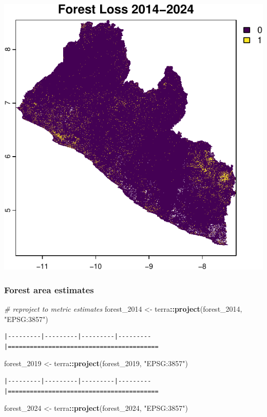 \documentclass[
]{article}
\newenvironment{Shaded}{\begin{snugshade}}{\end{snugshade}}
\newcommand{\CommentTok}[1]{\textcolor[rgb]{0.56,0.35,0.01}{\textit{#1}}}
\newcommand{\FunctionTok}[1]{\textcolor[rgb]{0.13,0.29,0.53}{\textbf{#1}}}
\newcommand{\NormalTok}[1]{#1}
\newcommand{\OtherTok}[1]{\textcolor[rgb]{0.56,0.35,0.01}{#1}}
\newcommand{\SpecialCharTok}[1]{\textcolor[rgb]{0.81,0.36,0.00}{\textbf{#1}}}
\newcommand{\StringTok}[1]{\textcolor[rgb]{0.31,0.60,0.02}{#1}}
\begin{document}
\includegraphics[width=0.33\linewidth]{rspb-gola-redd-review_files/figure-latex/unnamed-chunk-21-6}

\subsubsection{Forest area estimates}\label{forest-area-estimates}

\begin{Shaded}
\begin{Highlighting}[]
\CommentTok{\# reproject to metric estimates}
\NormalTok{forest\_2014 }\OtherTok{\textless{}{-}}\NormalTok{ terra}\SpecialCharTok{::}\FunctionTok{project}\NormalTok{(forest\_2014, }\StringTok{"EPSG:3857"}\NormalTok{)}
\end{Highlighting}
\end{Shaded}

\begin{verbatim}
|---------|---------|---------|---------|=========================================                                          
\end{verbatim}

\begin{Shaded}
\begin{Highlighting}[]
\NormalTok{forest\_2019 }\OtherTok{\textless{}{-}}\NormalTok{ terra}\SpecialCharTok{::}\FunctionTok{project}\NormalTok{(forest\_2019, }\StringTok{"EPSG:3857"}\NormalTok{)}
\end{Highlighting}
\end{Shaded}

\begin{verbatim}
|---------|---------|---------|---------|=========================================                                          
\end{verbatim}

\begin{Shaded}
\begin{Highlighting}[]
\NormalTok{forest\_2024 }\OtherTok{\textless{}{-}}\NormalTok{ terra}\SpecialCharTok{::}\FunctionTok{project}\NormalTok{(forest\_2024, }\StringTok{"EPSG:3857"}\NormalTok{)}
\end{Highlighting}
\end{Shaded}
\end{document}
